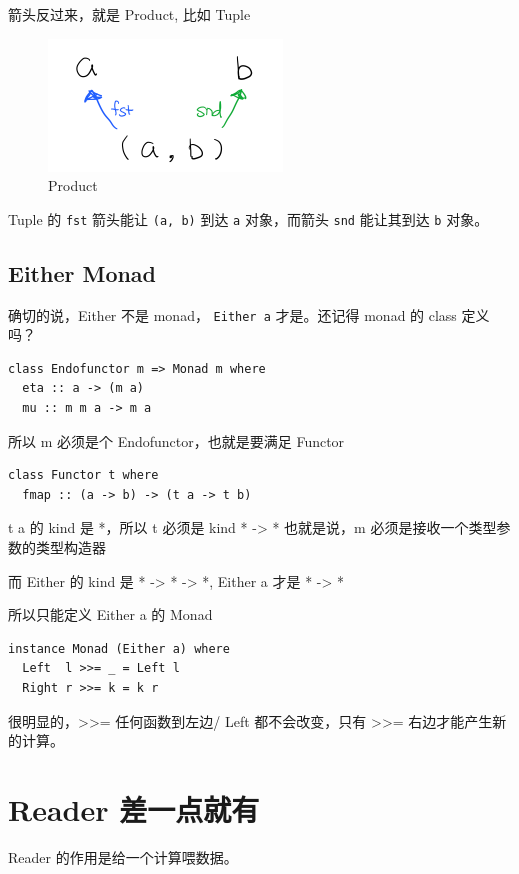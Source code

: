 \documentclass[11pt]{tufte-book}
\begin{document}
箭头反过来，就是 Product, 比如 Tuple

\begin{figure}[htbp]
\centering
\includegraphics[width=.9\linewidth]{images/p2-product.png}
\caption{Product}
\end{figure}

Tuple 的 \texttt{fst} 箭头能让 \texttt{(a, b)} 到达 \texttt{a} 对象，而箭头 \texttt{snd} 能让其到达 \texttt{b} 对象。

\section{Either Monad}
\label{sec:orgd190698}
确切的说，Either 不是 monad， \texttt{Either a} 才是。还记得 monad 的 class 定义吗？
\begin{verbatim}
class Endofunctor m => Monad m where
  eta :: a -> (m a)
  mu :: m m a -> m a
\end{verbatim}
所以 m 必须是个 Endofunctor，也就是要满足 Functor
\begin{verbatim}
class Functor t where
  fmap :: (a -> b) -> (t a -> t b)
\end{verbatim}
t a 的 kind 是 *，所以 t 必须是 kind * -> *
也就是说，m 必须是接收一个类型参数的类型构造器

而 Either 的 kind 是 * -> * -> *, Either a 才是 * -> *

所以只能定义 Either a 的 Monad
\begin{verbatim}
instance Monad (Either a) where
  Left  l >>= _ = Left l
  Right r >>= k = k r
\end{verbatim}

很明显的，>>= 任何函数到左边/ Left 都不会改变，只有 >>= 右边才能产生新的计算。


\chapter{Reader 差一点就有}
\label{sec:org7a33c1e}
Reader 的作用是给一个计算喂数据。
\end{document}
